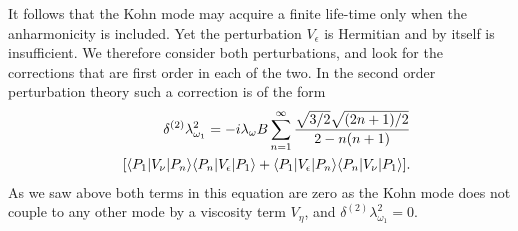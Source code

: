 It follows that the Kohn mode may acquire a finite life-time only when the anharmonicity is included.
Yet the perturbation $V_{\epsilon}$ is Hermitian and by itself is insufficient.
We therefore consider both perturbations, and look for the corrections that are first order in each of the two. In the second order perturbation theory such a correction is of the form     
\begin{eqnarray}
&&\hskip-.25cm\delta^{(2)}\lambda^2_{\omega_1}=-i\lambda_\omega B\sum^{\infty}_{n=1}\frac{\sqrt{3/2}\sqrt{(2n+1)/2}}{2-n(n+1)}\nonumber\\
&&\hskip-.25\times[\langle P_1|V_\nu| P_n\rangle\langle P_n|V_\epsilon| P_1\rangle+
\langle P_1|V_\epsilon| P_n\rangle\langle P_n|V_\nu| P_1\rangle].
\end{eqnarray}
As we saw above both terms in this equation are zero as the Kohn mode does not couple to any other mode by a viscosity term $V_{\eta}$, and $\delta^{(2)}\lambda^2_{\omega_1}=0$.

